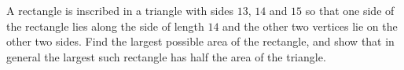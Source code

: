 A rectangle is inscribed in a triangle with sides $13$, $14$ and $15$ so that one side of the rectangle lies along the side of length $14$ and the other two vertices lie on the other two sides. Find the largest possible area of the rectangle, and show that in general the largest such rectangle has half the area of the triangle.

